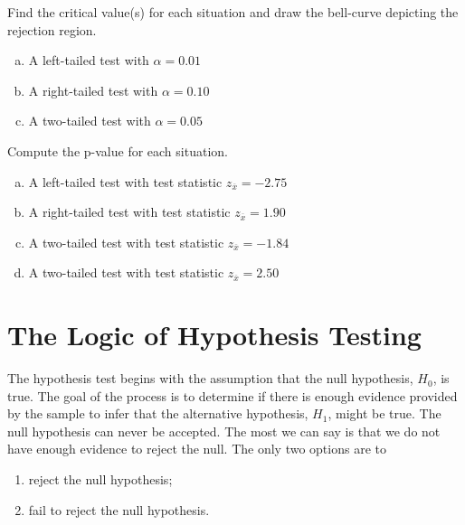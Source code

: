 \documentclass[12pt, letterpaper]{article}
\newcounter{exercise}
\theoremstyle{definition}
\begin{document}
\begin{exercise}
Find the critical value(s) for each situation and draw the bell-curve depicting the rejection region.
\end{exercise}

\begin{enumerate}[(a)]

\item A left-tailed test with $\alpha=0.01$

\vfill

\item A right-tailed test with $\alpha=0.10$

\vfill

\item A two-tailed test with $\alpha=0.05$

\vfill

\end{enumerate}

\newpage

\begin{exercise}
Compute the p-value for each situation.
\end{exercise}

\begin{enumerate}[(a)]

\item A left-tailed test with test statistic $z_{\overline{x}} = -2.75$

\vfill

\item A right-tailed test with test statistic $z_{\overline{x}} = 1.90$

\vfill

\item A two-tailed test with test statistic $z_{\overline{x}} = -1.84$

\vfill

\item A two-tailed test with test statistic $z_{\overline{x}} = 2.50$

\vfill

\end{enumerate}

\newpage

\section*{The Logic of Hypothesis Testing}


\noindent The hypothesis test begins with the assumption that the null hypothesis, $H_0$, is true.  The goal of the process is to determine if there is enough evidence provided by the sample to infer that the alternative hypothesis, $H_1$, might be true.  The null hypothesis can never be accepted.  The most we can say is that we do not have enough evidence to reject the null.  The only two options are to 
\begin{enumerate}[1)]

\item reject the null hypothesis;
\item fail to reject the null hypothesis.

\end{enumerate}
\end{document}
